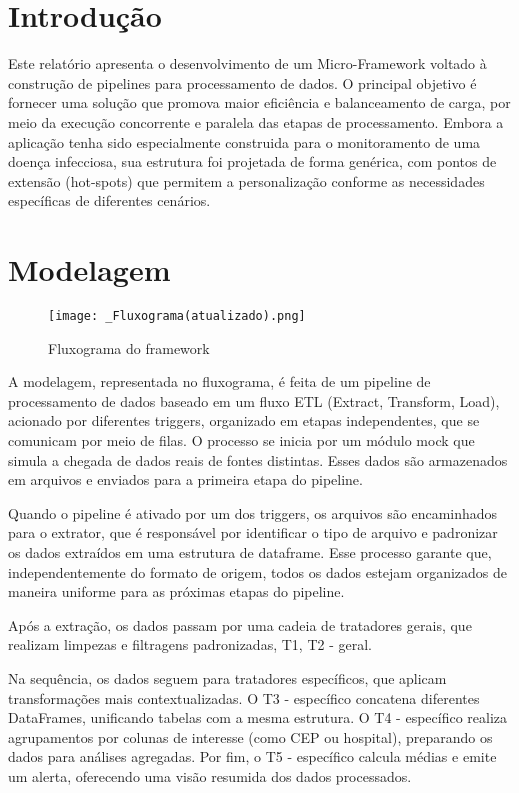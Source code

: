 \documentclass[a4paper,12pt]{article}
\begin{document}
\tableofcontents
\newpage


\section{Introdução}
Este relatório apresenta o desenvolvimento de um Micro-Framework voltado à construção de pipelines para processamento de dados. O principal objetivo é fornecer uma solução que promova maior eficiência e balanceamento de carga, por meio da execução concorrente e paralela das etapas de processamento. Embora a aplicação tenha sido especialmente construida para o monitoramento de uma doença infecciosa, sua estrutura foi projetada de forma genérica, com pontos de extensão (hot-spots) que permitem a personalização conforme as necessidades específicas de diferentes cenários.

\section{Modelagem}

\begin{figure}[H]
    \hspace{-1cm}
    \texttt{[image: \_Fluxograma(atualizado).png]}
    \caption{Fluxograma do framework}
    \label{fig:minha_imagem}
\end{figure}

A modelagem, representada no fluxograma, é feita de um pipeline de processamento de dados baseado em um fluxo ETL (Extract, Transform, Load), acionado por diferentes triggers, organizado em etapas independentes, que se comunicam por meio de filas. O processo se inicia por um módulo mock que simula a chegada de dados reais de fontes distintas. Esses dados são armazenados em arquivos e enviados para a primeira etapa do pipeline.

Quando o pipeline é ativado por um dos triggers, os arquivos são encaminhados para o extrator, que é responsável por identificar o tipo de arquivo e padronizar os dados extraídos em uma estrutura de dataframe. Esse processo garante que, independentemente do formato de origem, todos os dados estejam organizados de maneira uniforme para as próximas etapas do pipeline.

Após a extração, os dados passam por uma cadeia de tratadores gerais, que realizam limpezas e filtragens padronizadas, T1, T2 - geral.

Na sequência, os dados seguem para tratadores específicos, que aplicam transformações mais contextualizadas. O T3 - específico concatena diferentes DataFrames, unificando tabelas com a mesma estrutura. O T4 - específico realiza agrupamentos por colunas de interesse (como CEP ou hospital), preparando os dados para análises agregadas. Por fim, o T5 - específico calcula médias e emite um alerta, oferecendo uma visão resumida dos dados processados.
\end{document}
